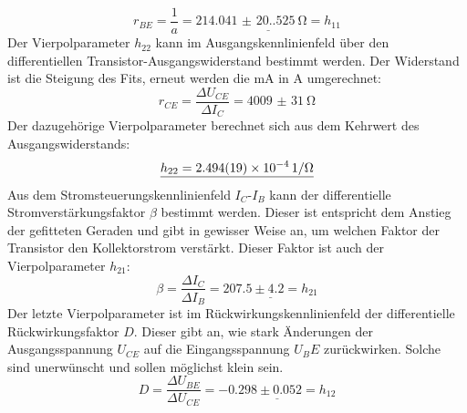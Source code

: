 \documentclass[12pt,a4paper,ngerman]{report}
\begin{document}
	\begin{equation}
		r_{BE} = \frac{1}{a} = \underline{\SI{214.041(20.525)}{\ohm} = h_{11}}
	\end{equation}
	Der Vierpolparameter $h_{22}$ kann im Ausgangskennlinienfeld über den differentiellen Transistor-Ausgangswiderstand bestimmt werden. Der Widerstand ist die Steigung des Fits, erneut werden die \si{\milli \ampere} in \si{\ampere} umgerechnet:
	\begin{equation}
		r_{CE} =  \frac{\Delta U_{CE}}{\Delta I_{C}} = \SI{4009(31)}{\ohm}
	\end{equation}
	Der dazugehörige Vierpolparameter berechnet sich aus dem Kehrwert des Ausgangswiderstands:
	\begin{equation}
		\underline{h_{22} = \SI{2.494(19)E-4}{1 \per \ohm}}
	\end{equation}
	Aus dem Stromsteuerungskennlinienfeld $I_C$-$I_B$ kann der differentielle Stromverstärkungsfaktor $\beta$ bestimmt werden. Dieser ist entspricht dem Anstieg der gefitteten Geraden und gibt in gewisser Weise an, um welchen Faktor der Transistor den Kollektorstrom verstärkt. Dieser Faktor ist auch der Vierpolparameter $h_{21}$:
	\begin{equation}
		\beta =  \frac{\Delta I_{C}}{\Delta I_{B}} = \underline{207.5 \pm 4.2 = h_{21}}
	\end{equation}
	Der letzte Vierpolparameter ist im Rückwirkungskennlinienfeld der differentielle Rückwirkungsfaktor $D$. Dieser gibt an, wie stark Änderungen der Ausgangsspannung $U_{CE}$ auf die Eingangsspannung $U_BE$ zurückwirken. Solche sind unerwünscht und sollen möglichst klein sein. 
	\begin{equation}
		 D = \frac{\Delta U_{BE}}{\Delta U_{CE}} = \underline{-0.298 \pm 0.052 = h_{12}}
	\end{equation}
\end{document}
